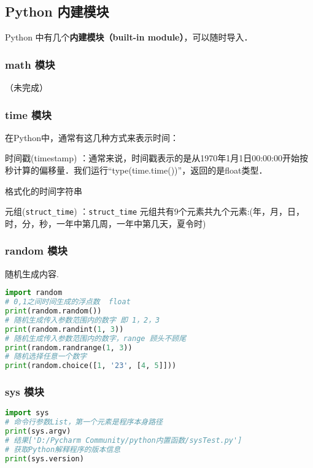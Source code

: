 \subsection{Python 内建模块}
Python 中有几个\textbf{内建模块（built-in module）}，可以随时导入．

\subsubsection{math 模块}
（未完成）

\subsubsection{time 模块}
在Python中，通常有这几种方式来表示时间：

时间戳(timestamp) ：通常来说，时间戳表示的是从1970年1月1日00:00:00开始按秒计算的偏移量．我们运行“type(time.time())”，返回的是float类型．

格式化的时间字符串

元组(\verb|struct_time|)   ：\verb|struct_time| 元组共有9个元素共九个元素:(年，月，日，时，分，秒，一年中第几周，一年中第几天，夏令时)

\subsubsection{random 模块}
随机生成内容.
\begin{lstlisting}[language=python]
import random
# 0,1之间时间生成的浮点数  float
print(random.random())
# 随机生成传入参数范围内的数字 即 1，2，3
print(random.randint(1, 3))
# 随机生成传入参数范围内的数字，range 顾头不顾尾
print(random.randrange(1, 3))
# 随机选择任意一个数字
print(random.choice([1, '23', [4, 5]]))
\end{lstlisting}

\subsubsection{sys 模块}
\begin{lstlisting}[language=python]
import sys
# 命令行参数List，第一个元素是程序本身路径
print(sys.argv)
# 结果['D:/Pycharm Community/python内置函数/sysTest.py']
# 获取Python解释程序的版本信息
print(sys.version)
\end{lstlisting}

